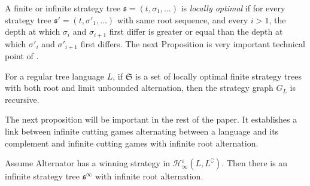 A finite or infinite strategy tree $\mathfrak{s}=(t, \sigma_1, \dots)$ is \emph{locally optimal} if for every strategy tree $\mathfrak{s}'=(t, \sigma'_1, \dots)$ with same root sequence, and every $i>1$, the depth at which $\sigma_i$ and $\sigma_{i+1}$ first differ is greater or equal than the depth at which $\sigma'_i$ and $\sigma'_{i+1}$ first differs.
The next Proposition is very important technical point of \cite{bp}. 
\begin{proposition}[\cite{bp}]\label{prop:locality}
 For a regular tree language $L$, if $\mathfrak{S}$ is a set of locally optimal finite strategy trees with both root and limit unbounded alternation, then the strategy graph $G_L$ is recursive.
 \end{proposition}
The next proposition will be important in the rest of the paper. It establishes a link between infinite cutting games alternating between a language and its complement and infinite cutting games with infinite root alternation.
\begin{proposition}\label{prop:types}
 Assume Alternator has a winning strategy in  $\mathcal{H}^\varepsilon_\infty(L, L^\complement)$. Then there is an infinite strategy tree $\mathfrak{s}^\infty$ with infinite root alternation. 
\end{proposition} 
